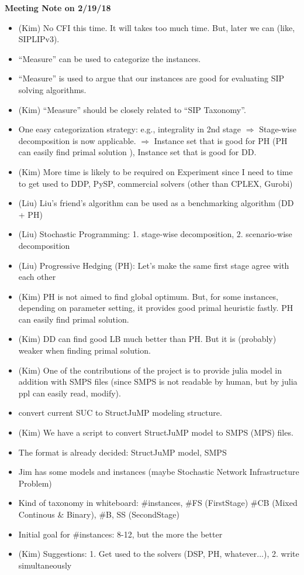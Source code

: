 \documentclass[11pt,english]{article}
\begin{document}
{\Large \textbf{Meeting Note on 2/19/18}}\\
\begin{itemize}
	\item (Kim) No CFI this time. It will takes too much time. But, later we can (like, SIPLIPv3).
	\item ``Measure'' can be used to categorize the instances.
	\item ``Measure'' is used to argue that our instances are good for evaluating SIP solving algorithms.
	\item (Kim) ``Measure'' should be closely related to ``SIP Taxonomy''. 
	\item One easy categorization strategy: e.g., integrality in 2nd stage $\Rightarrow$ Stage-wise decomposition is now applicable. $\Rightarrow$ Instance set that is good for PH (PH can easily find primal solution ), Instance set that is good for DD.
	\item (Kim) More time is likely to be required on Experiment since I need to time to get used to DDP, PySP, commercial solvers (other than CPLEX, Gurobi)
	\item (Liu) Liu's friend's algorithm can be used as a benchmarking algorithm (DD + PH) 
	\item (Liu) Stochastic Programming: 1. stage-wise decomposition, 2. scenario-wise decomposition
	\item (Liu) Progressive Hedging (PH): Let's make the same first stage agree with each other
	\item (Kim) PH is not aimed to find global optimum. But, for some instances, depending on parameter setting, it provides good primal heuristic fastly. PH can easily find primal solution.
	\item (Kim) DD can find good LB much better than PH. But it is (probably) weaker when finding primal solution.
	\item (Kim) One of the contributions of the project is to provide julia model in addition with SMPS files (since SMPS is not readable by human, but by julia ppl can easily read, modify).
	\item convert current SUC to StructJuMP modeling structure.
	\item (Kim) We have a script to convert StructJuMP model to SMPS (MPS) files.
	\item The format is already decided: StructJuMP model, SMPS
	\item Jim has some models and instances (maybe Stochastic Network Infrastructure Problem)
	\item Kind of taxonomy in whiteboard: \#instances, \#FS (FirstStage) \#CB (Mixed Continous \& Binary), \#B, SS (SecondStage)
	\item Initial goal for \#instances: 8-12, but the more the better
	\item (Kim) Suggestions: 1. Get used to the solvers (DSP, PH, whatever...), 2. write simultaneously
\end{itemize}
\end{document}
